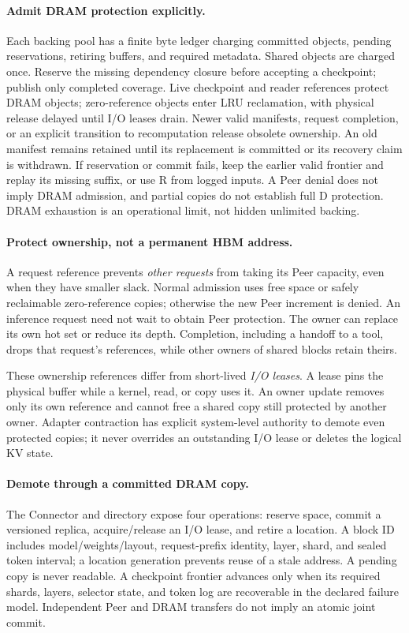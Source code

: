 \paragraph{Admit DRAM protection explicitly.}
Each backing pool has a finite byte ledger charging committed objects,
pending reservations, retiring buffers, and required metadata. Shared
objects are charged once. Reserve the missing dependency closure before
accepting a checkpoint; publish only completed coverage. Live checkpoint
and reader references protect DRAM objects; zero-reference objects enter
LRU reclamation, with physical release delayed until I/O leases drain.
Newer valid manifests, request completion, or an explicit transition to
recomputation release obsolete ownership. An old manifest remains retained
until its replacement is committed or its recovery claim is withdrawn.
If reservation or commit fails, keep the earlier valid frontier and replay
its missing suffix, or use R from logged inputs. A Peer denial does not
imply DRAM admission, and partial copies do not establish full D protection.
DRAM exhaustion is an operational limit, not hidden unlimited backing.

\paragraph{Protect ownership, not a permanent HBM address.}
A request reference prevents \emph{other requests} from taking its Peer
capacity, even when they have smaller slack. Normal admission uses free
space or safely reclaimable zero-reference copies; otherwise the new
Peer increment is denied. An inference request need not wait to obtain
Peer protection. The owner can replace its own hot set or reduce its
depth. Completion, including a handoff to a tool, drops that request's
references, while other owners of shared blocks retain theirs.

These ownership references differ from short-lived \emph{I/O leases}.
A lease pins the physical buffer while a kernel, read, or copy uses it.
An owner update removes only its own reference and cannot free a shared
copy still protected by another owner. Adapter contraction has explicit
system-level authority to demote even protected copies; it never overrides
an outstanding I/O lease or deletes the logical KV state.

\paragraph{Demote through a committed DRAM copy.}
The Connector and directory expose four operations:
reserve space, commit a versioned replica, acquire/release an I/O lease,
and retire a location. A block ID includes model/weights/layout, request-prefix
identity, layer, shard, and sealed token interval; a location generation
prevents reuse of a stale address. A pending copy is never readable.
A checkpoint frontier advances only when its required shards, layers,
selector state, and token log are recoverable in the declared failure model.
Independent Peer and DRAM transfers do not imply an atomic joint commit.

